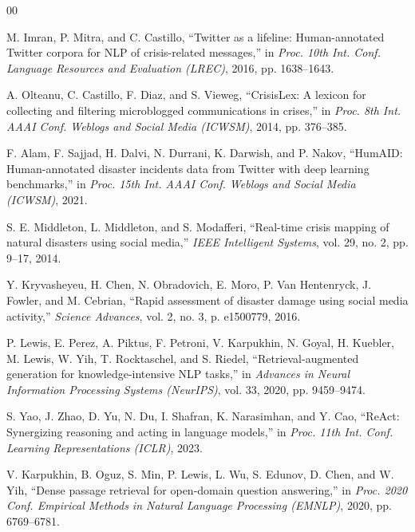 \documentclass[conference]{IEEEtran}
\begin{document}
\begin{thebibliography}{00}

M. Imran, P. Mitra, and C. Castillo, ``Twitter as a lifeline: Human-annotated
Twitter corpora for NLP of crisis-related messages,'' in \textit{Proc. 10th Int.
Conf. Language Resources and Evaluation (LREC)}, 2016, pp. 1638--1643.

A. Olteanu, C. Castillo, F. Diaz, and S. Vieweg, ``CrisisLex: A lexicon for
collecting and filtering microblogged communications in crises,'' in \textit{Proc.
8th Int. AAAI Conf. Weblogs and Social Media (ICWSM)}, 2014, pp. 376--385.

F. Alam, F. Sajjad, H. Dalvi, N. Durrani, K. Darwish, and P. Nakov, ``HumAID:
Human-annotated disaster incidents data from Twitter with deep learning
benchmarks,'' in \textit{Proc. 15th Int. AAAI Conf. Weblogs and Social Media
(ICWSM)}, 2021.

S. E. Middleton, L. Middleton, and S. Modafferi, ``Real-time crisis mapping of
natural disasters using social media,'' \textit{IEEE Intelligent Systems},
vol. 29, no. 2, pp. 9--17, 2014.

Y. Kryvasheyeu, H. Chen, N. Obradovich, E. Moro, P. Van Hentenryck,
J. Fowler, and M. Cebrian, ``Rapid assessment of disaster damage using social
media activity,'' \textit{Science Advances}, vol. 2, no. 3, p. e1500779, 2016.

P. Lewis, E. Perez, A. Piktus, F. Petroni, V. Karpukhin, N. Goyal, H. Kuebler,
M. Lewis, W. Yih, T. Rocktaschel, and S. Riedel, ``Retrieval-augmented generation
for knowledge-intensive NLP tasks,'' in \textit{Advances in Neural Information
Processing Systems (NeurIPS)}, vol. 33, 2020, pp. 9459--9474.

S. Yao, J. Zhao, D. Yu, N. Du, I. Shafran, K. Narasimhan, and Y. Cao,
``ReAct: Synergizing reasoning and acting in language models,'' in \textit{Proc.
11th Int. Conf. Learning Representations (ICLR)}, 2023.

V. Karpukhin, B. Oguz, S. Min, P. Lewis, L. Wu, S. Edunov, D. Chen, and
W. Yih, ``Dense passage retrieval for open-domain question answering,'' in
\textit{Proc. 2020 Conf. Empirical Methods in Natural Language Processing
(EMNLP)}, 2020, pp. 6769--6781.


\end{thebibliography}
\end{document}

